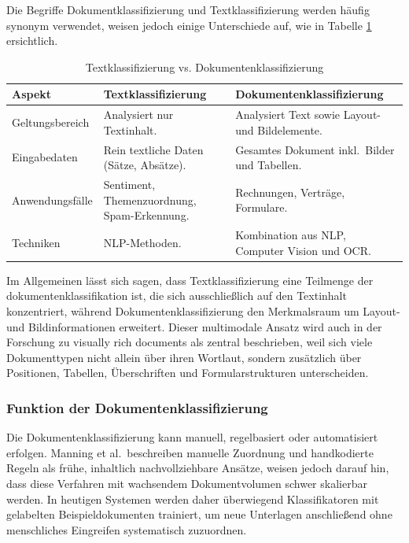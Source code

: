 Die Begriffe Dokumentklassifizierung und Textklassifizierung werden häufig synonym verwendet, weisen jedoch einige Unterschiede auf, wie in Tabelle \ref{tab:klassifizierung} ersichtlich.

\begin{table}[h]
\centering
\caption{Textklassifizierung vs. Dokumentenklassifizierung \cite{manning2008irbook,aws_comprehend_training_classification_models,azure_document_intelligence_custom_classifier}}
\label{tab:klassifizierung}
\begin{tabular}{p{3cm} p{5.5cm}p{5.5cm}}
\textbf{Aspekt} & \textbf{Textklassifizierung} & \textbf{Dokumentenklassifizierung} \\ \hline

Geltungsbereich &
Analysiert nur Textinhalt. &
Analysiert Text sowie Layout- und Bildelemente. \\ \hline

Eingabedaten &
Rein textliche Daten (Sätze, Absätze). &
Gesamtes Dokument inkl.\ Bilder und Tabellen. \\ \hline

Anwendungsfälle &
Sentiment, Themenzuordnung, Spam-Erkennung. &
Rechnungen, Verträge, Formulare. \\ \hline

Techniken &
NLP-Methoden. &
Kombination aus NLP, Computer Vision und OCR. \\ \hline

\end{tabular}
\end{table}

Im Allgemeinen lässt sich sagen, dass Textklassifizierung eine Teilmenge der \gls{dokumentenklassifikation} ist, die sich ausschließlich auf den Textinhalt konzentriert, während Dokumentenklassifizierung den Merkmalsraum um Layout- und Bildinformationen erweitert. Dieser multimodale Ansatz wird auch in der Forschung zu \glqq visually rich documents\grqq{} als zentral beschrieben, weil sich viele Dokumenttypen nicht allein über ihren Wortlaut, sondern zusätzlich über Positionen, Tabellen, Überschriften und Formularstrukturen unterscheiden. \cite{vrdcu_survey_2024,layoutlm_2020,layoutlmv2_2021}


\newpage
\subsubsection{Funktion der Dokumentenklassifizierung}
Die Dokumentenklassifizierung kann manuell, regelbasiert oder automatisiert erfolgen. Manning et al.\ beschreiben manuelle Zuordnung und handkodierte Regeln als frühe, inhaltlich nachvollziehbare Ansätze, weisen jedoch darauf hin, dass diese Verfahren mit wachsendem Dokumentvolumen schwer skalierbar werden. In heutigen Systemen werden daher überwiegend Klassifikatoren mit gelabelten Beispieldokumenten trainiert, um neue Unterlagen anschließend ohne menschliches Eingreifen systematisch zuzuordnen. \cite{manning2008irbook,aws_comprehend_custom_classification,googlecloud_documentai_custom_classifier}\\



